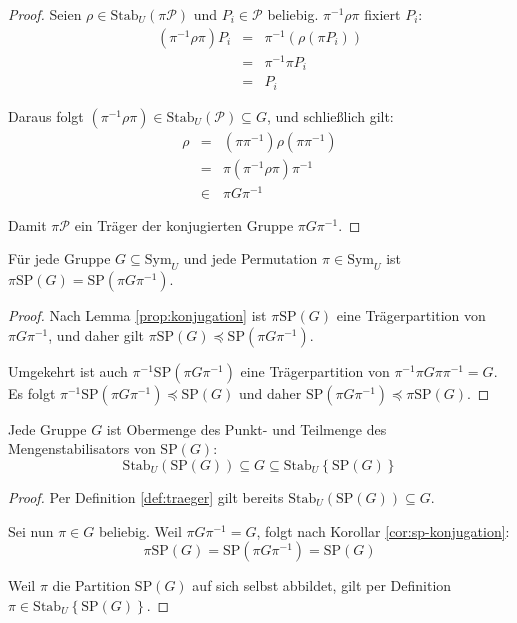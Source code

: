 \begin{proof}
Seien $\rho\in\mathrm{Stab}_{U}\left(\pi\mathcal{P}\right)$ und $P_{i}\in\mathcal{P}$
beliebig. $\pi^{-1}\rho\pi$ fixiert $P_{i}$:
\begin{eqnarray*}
\left(\pi^{-1}\rho\pi\right)P_{i} & = & \pi^{-1}\left(\rho\left(\pi P_{i}\right)\right)\\
 & = & \pi^{-1}\pi P_{i}\\
 & = & P_{i}
\end{eqnarray*}

Daraus folgt $\left(\pi^{-1}\rho\pi\right)\in\mathrm{Stab}_{U}\left(\mathcal{P}\right)\subseteq G$,
und schließlich gilt:
\begin{eqnarray*}
\rho & = & \left(\pi\pi^{-1}\right)\rho\left(\pi\pi^{-1}\right)\\
 & = & \pi\left(\pi^{-1}\rho\pi\right)\pi^{-1}\\
 & \in & \pi G\pi^{-1}
\end{eqnarray*}

Damit $\pi\mathcal{P}$ ein Träger der konjugierten Gruppe $\pi G\pi^{-1}$.
\end{proof}
\begin{cor}
\label{cor:sp-konjugation}Für jede Gruppe $G\subseteq\mathrm{Sym}_{U}$
und jede Permutation $\pi\in\mathrm{Sym}_{U}$ ist $\pi\mathrm{SP}\left(G\right)=\mathrm{SP}\left(\pi G\pi^{-1}\right)$.
\end{cor}
\begin{proof}
Nach Lemma \ref{prop:konjugation} ist $\pi\mathrm{SP}\left(G\right)$
eine Trägerpartition von $\pi G\pi^{-1}$, und daher gilt $\pi\mathrm{SP}\left(G\right)\preceq\mathrm{SP}\left(\pi G\pi^{-1}\right)$.

Umgekehrt ist auch $\pi^{-1}\mathrm{SP}\left(\pi G\pi^{-1}\right)$
eine Trägerpartition von $\pi^{-1}\pi G\pi\pi^{-1}=G$. Es folgt $\pi^{-1}\mathrm{SP}\left(\pi G\pi^{-1}\right)\preceq\mathrm{SP}\left(G\right)$
und daher $\mathrm{SP}\left(\pi G\pi^{-1}\right)\preceq\pi\mathrm{SP}\left(G\right)$.
\end{proof}
\begin{prop}
Jede Gruppe $G$ ist Obermenge des Punkt- und Teilmenge des Mengenstabilisators
von $\mathrm{SP}\left(G\right)$:
\[
\mathrm{Stab}_{U}\left(\mathrm{SP}\left(G\right)\right)\subseteq G\subseteq\mathrm{Stab}_{U}\left\{ \mathrm{SP}\left(G\right)\right\} 
\]
\end{prop}
\begin{proof}
Per Definition \ref{def:traeger} gilt bereits $\mathrm{Stab}_{U}\left(\mathrm{SP}\left(G\right)\right)\subseteq G$.

Sei nun $\pi\in G$ beliebig. Weil $\pi G\pi^{-1}=G$, folgt nach
Korollar \ref{cor:sp-konjugation}: 
\[
\pi\mathrm{SP}\left(G\right)=\mathrm{SP}\left(\pi G\pi^{-1}\right)=\mathrm{SP}\left(G\right)
\]

Weil $\pi$ die Partition $\mathrm{SP}\left(G\right)$ auf sich selbst
abbildet, gilt per Definition $\pi\in\mathrm{Stab}_{U}\left\{ \mathrm{SP}\left(G\right)\right\} $.
\end{proof}

